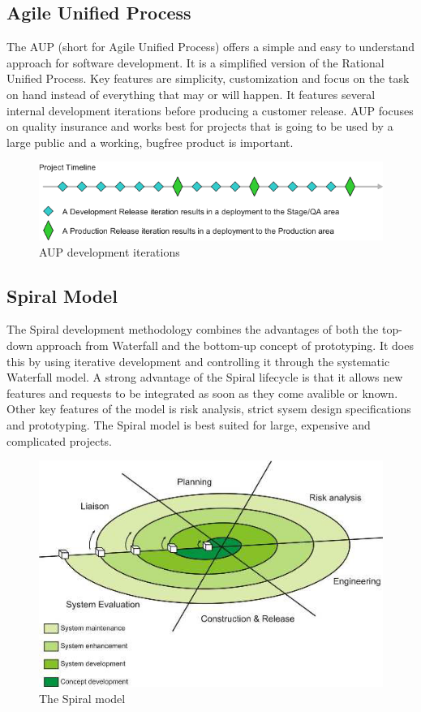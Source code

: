 \subsection{Agile Unified Process}
The AUP (short for Agile Unified Process) offers a simple and easy to understand approach for software
development. It is a simplified version of the Rational Unified Process. Key features are simplicity, 
customization and focus on the task on hand instead of everything that may or will happen. It features 
several internal development iterations before producing a customer release. AUP focuses on quality
insurance and works best for projects that is going to be used by a large public and a working, bugfree
product is important.
\begin{figure}[h!]
\centering \includegraphics[scale=0.65]{img/designmodel-aup} \caption{AUP development iterations}
\label{fig:desigmodel-aupl}
\end{figure}

\subsection{Spiral Model}
The Spiral development methodology combines the advantages of both the top-down approach from 
Waterfall and the bottom-up concept of prototyping. It does this by using iterative development and
controlling it through the systematic Waterfall model. A strong advantage of the Spiral lifecycle is that it
allows new features and requests to be integrated as soon as they come avalible or known. Other key 
features of the model is risk analysis, strict sysem design specifications and prototyping. The Spiral model
 is best suited for large, expensive and complicated projects.
\begin{figure}[h!]
\centering \includegraphics[scale=0.85]{img/designmodel-spiral} \caption{The Spiral model}
\label{fig:desigmodel-spiral}
\end{figure}

